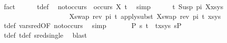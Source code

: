 \begin{isabellebody}
\ fact\isanewline
\ \ \ \ \isamarkupfalse%
\ t{}{\isacharunderscore}{\kern0pt}def\ \isamarkupfalse%
\ not{\isacharunderscore}{\kern0pt}occurs{\isacharcolon}{\kern0pt}\ {\isachardoublequoteopen}{\isasymnot}\ occurs\ X\ t{}{\isachardoublequoteclose}\ \isamarkupfalse%
\ simp\isanewline
\ \ \ \ \isamarkupfalse%
\ {\isachardoublequoteopen}{\isacharparenleft}{\kern0pt}{\isacharparenleft}{\kern0pt}t{}{\isasymapprox}{\isacharquery}{\kern0pt}\ Susp\ pi\ X{\isacharparenright}{\kern0pt}{\isacharhash}{\kern0pt}xs{\isacharcomma}{\kern0pt}ys{\isacharparenright}{\kern0pt}\ \isanewline
\ \ \ \ \ \ \ \ \ \ \ \ \ \ \ \ \ \ \ \ {\isasymturnstile}{\isacharbrackleft}{\kern0pt}{\isacharparenleft}{\kern0pt}X{\isacharcomma}{\kern0pt}swap\ {\isacharparenleft}{\kern0pt}rev\ pi{\isacharparenright}{\kern0pt}\ t{}{\isacharparenright}{\kern0pt}{\isacharbrackright}{\kern0pt}{\isasymleadsto}\ apply{\isacharunderscore}{\kern0pt}subst\ {\isacharbrackleft}{\kern0pt}{\isacharparenleft}{\kern0pt}X{\isacharcomma}{\kern0pt}swap\ {\isacharparenleft}{\kern0pt}rev\ pi{\isacharparenright}{\kern0pt}\ t{}{\isacharparenright}{\kern0pt}{\isacharbrackright}{\kern0pt}\ {\isacharparenleft}{\kern0pt}xs{\isacharcomma}{\kern0pt}ys{\isacharparenright}{\kern0pt}{\isachardoublequoteclose}\isanewline
\ \ \ \ \ \ \isamarkupfalse%
\ t{}{\isacharunderscore}{\kern0pt}def\ var{\isacharunderscore}{\kern0pt}{}{\isacharunderscore}{\kern0pt}sred{\isacharbrackleft}{\kern0pt}OF\ not{\isacharunderscore}{\kern0pt}occurs{\isacharbrackright}{\kern0pt}\ \isamarkupfalse%
\ simp\isanewline
\ \ \ \ \isamarkupfalse%
\ {\isachardoublequoteopen}{\isasymexists}\ P{}\ s{\isachardot}{\kern0pt}\ {\isacharparenleft}{\kern0pt}{\isacharparenleft}{\kern0pt}t{}\ {\isasymapprox}{\isacharquery}{\kern0pt}\ t{}{\isacharparenright}{\kern0pt}{\isacharhash}{\kern0pt}xs{\isacharcomma}{\kern0pt}ys{\isacharparenright}{\kern0pt}\ {\isasymTurnstile}{\isacharparenleft}{\kern0pt}{\isacharbraceleft}{\kern0pt}{\isacharbraceright}{\kern0pt}{\isacharcomma}{\kern0pt}s{\isacharparenright}{\kern0pt}{\isasymRightarrow}P{}{\isachardoublequoteclose}\isanewline
\ \ \ \ \ \ \isamarkupfalse%
\ t{}{\isacharunderscore}{\kern0pt}def\ t{}{\isacharunderscore}{\kern0pt}def\ sred{\isacharunderscore}{\kern0pt}single\ \isamarkupfalse%
\ blast\isanewline

\end{isabellebody}
